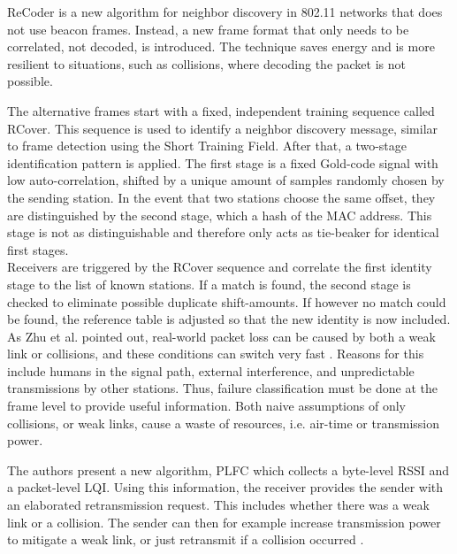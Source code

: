 ReCoder \cite{meng2015} is a new algorithm for neighbor discovery in 802.11 networks that does not use beacon frames. Instead, a new frame format that only needs to be correlated, not decoded, is introduced. The technique saves energy and is more resilient to situations, such as collisions, where decoding the packet is not possible.

The alternative frames start with a fixed, independent training sequence called RCover. This sequence is used to identify a neighbor discovery message, similar to frame detection using the Short Training Field. After that, a two-stage identification pattern is applied. The first stage is a fixed Gold-code signal with low auto-correlation, shifted by a unique amount of samples randomly chosen by the sending station. In the event that two stations choose the same offset, they are distinguished by the second stage, which a hash of the \gls{MAC} address. This stage is not as distinguishable and therefore only acts as tie-beaker for identical first stages.\\

Receivers are triggered by the RCover sequence and correlate the first identity stage to the list of known stations. If a match is found, the second stage is checked to eliminate possible duplicate shift-amounts. If however no match could be found, the reference table is adjusted so that the new identity is now included.\\

As Zhu et al. pointed out, real-world packet loss can be caused by both a weak link or collisions, and these conditions can switch very fast \cite{zhu2016}. Reasons for this include humans in the signal path, external interference, and unpredictable transmissions by other stations. Thus, failure classification must be done at the frame level to provide useful information. Both naive assumptions of only collisions, or weak links, cause a waste of resources, i.e. air-time or transmission power.

The authors present a new algorithm, \gls{PLFC} which collects a byte-level \gls{RSSI} and a packet-level \gls{LQI}. Using this information, the receiver provides the sender with an elaborated retransmission request. This includes whether there was a weak link or a collision. The sender can then for example increase transmission power to mitigate a weak link, or just retransmit if a collision occurred \cite{zhu2016}.\\


